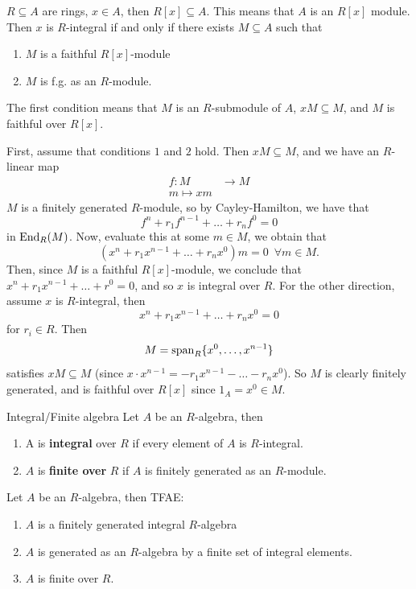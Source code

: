 \documentclass{article}
\begin{document}
\begin{fancyprop}{}
    $R \subseteq A$ are rings, $x \in A$, then $R[x] \subseteq A$. 
    This means that $A$ is an $R[x]$ module. Then $x$ is $R$-integral if and only if there exists $M \subseteq A$ such that \begin{enumerate}
        \item $M$ is a faithful $R[x]$-module
        \item $M$ is f.g. as an $R$-module.
    \end{enumerate}
    The first condition means that $M$ is an $R$-submodule of $A$, $xM \subseteq M$, and $M$ is faithful over $R[x]$.
\end{fancyprop}
\proof First, assume that conditions $1$ and $2$ hold. Then $xM \subseteq M$, and we have an $R$-linear map \begin{align*}
    f: M &\to M\\
    m \mapsto xm
\end{align*}
$M$ is a finitely generated $R$-module, so by Cayley-Hamilton, we have that \[f^{n} + r_{1}f^{n-1} + \dots + r_{n}f^{0}=0\] in $\operatorname{End}_{R}(M)$. Now, evaluate this at some $m \in M$, we obtain that \[ (x^{n} + r_{1}x^{n-1} + \dots + r_{n}x^{0})m = 0 \, \,\, \forall m \in M.\] Then, since $M$ is a faithful $R[x]$-module, we conclude that $x^{n} + r_{1}x^{n-1} + \dots + r^{0}=0$, and so $x$ is integral over $R$.\gap 
For the other direction, assume $x$ is $R$-integral, then \[x^{n} + r_{1}x^{n-1} + \dots + r_{n}x^{0}=0\] for $r_{i} \in R$. Then \[M = \operatorname{span}_{R}\{x^{0},\dots,x^{n-1}\}\] satisfies $xM \subseteq M$ (since $x \cdot x^{n-1} = -r_{1}x^{n-1} - \dots - r_{n}x^{0}$). So $M$ is clearly finitely generated, and is faithful over $R[x]$ since $1_{A} = x^{0} \in M$. \endproof
\begin{fancydefine}{Integral/Finite algebra}
    Let \newlec $A$ be an $R$-algebra, then \begin{enumerate}
        \item A is \textbf{integral} over $R$ if every element of $A$ is $R$-integral.
        \item $A$ is \textbf{finite over} $R$ if $A$ is finitely generated as an $R$-module.
    \end{enumerate}
\end{fancydefine}
\begin{fancyprop}{}
    Let $A$ be an $R$-algebra, then TFAE: \begin{enumerate}
        \item $A$ is a finitely generated integral $R$-algebra
        \item $A$ is generated as an $R$-algebra by a finite set of integral elements.
        \item $A$ is finite over $R$.
    \end{enumerate}
\end{fancyprop}
\end{document}
